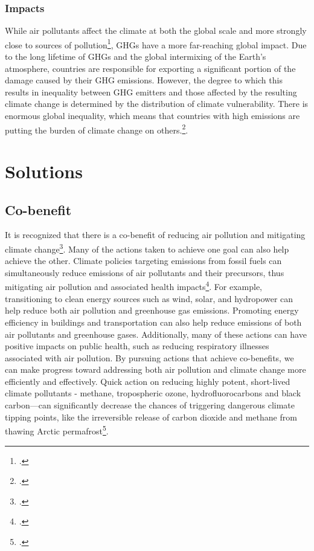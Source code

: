 \documentclass[]{article}
\begin{document}
 \subsubsection{Impacts}


 While air pollutants affect the climate at both the global scale and more strongly close to sources of pollution\footcite{Warrilow2021}, GHGs have a more far-reaching global impact. Due to the long lifetime of GHGs and the global intermixing of the Earth's atmosphere, countries are responsible for exporting a significant portion of the damage caused by their GHG emissions. However, the degree to which this results in inequality between GHG emitters and those affected by the resulting climate change is determined by the distribution of climate vulnerability. There is enormous global inequality, which means that countries with high emissions are putting the burden of climate change on others.\footcite{Althor2016}.
 


\section{Solutions}



\subsection{Co-benefit}

It is recognized that there is a co-benefit of reducing air pollution and mitigating climate change\footcite{WorldBank}. Many of the actions taken to achieve one goal can also help achieve the other. Climate policies targeting  emissions from fossil fuels can simultaneously reduce emissions of air pollutants and their precursors, thus mitigating air pollution and associated health impacts\footcite{Li2019}.
For example, transitioning to clean energy sources such as wind, solar, and hydropower can help reduce both air pollution and greenhouse gas emissions. Promoting energy efficiency in buildings and transportation can also help reduce emissions of both air pollutants and greenhouse gases. Additionally, many of these actions can have positive impacts on public health, such as reducing respiratory illnesses associated with air pollution. By pursuing actions that achieve co-benefits, we can make progress toward addressing both air pollution and climate change more efficiently and effectively.
Quick action on reducing highly potent, short-lived climate pollutants - methane, tropospheric ozone, hydrofluorocarbons and black carbon—can significantly decrease the chances of triggering dangerous climate tipping points, like the irreversible release of carbon dioxide and methane from thawing Arctic permafrost\footcite{UN2019}.
\end{document}
